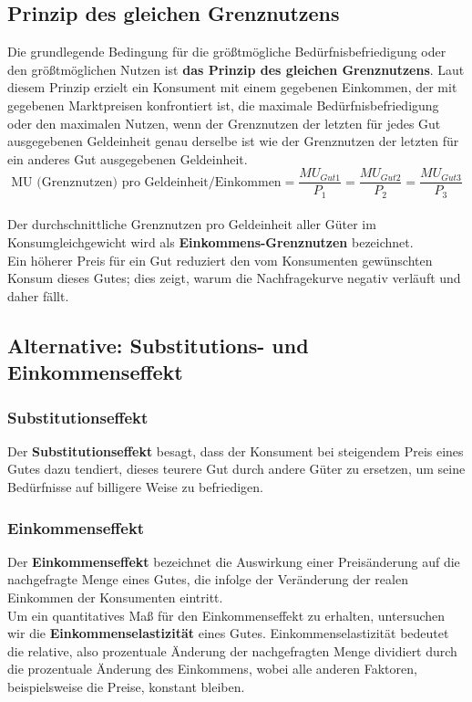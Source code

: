 \documentclass[10pt]{scrartcl}
\begin{document}
\subsection{Prinzip des gleichen Grenznutzens}
Die grundlegende Bedingung für die größtmögliche Bedürfnisbefriedigung oder den größtmöglichen Nutzen ist {\bf das Prinzip des gleichen Grenznutzens}. Laut diesem Prinzip erzielt ein Konsument mit einem gegebenen Einkommen, der mit gegebenen Marktpreisen konfrontiert ist, die maximale Bedürfnisbefriedigung oder den maximalen Nutzen, wenn der Grenznutzen der letzten für jedes Gut ausgegebenen Geldeinheit genau derselbe ist wie der Grenznutzen der letzten für ein anderes Gut ausgegebenen Geldeinheit.\\
\begin{equation}
\text{MU (Grenznutzen) pro Geldeinheit/Einkommen} = \frac{MU_{Gut1}}{P_{1}} = \frac{MU_{Gut2}}{P_{2}} = \frac{MU_{Gut3}}{P_{3}} \nonumber
\end{equation}\\
Der durchschnittliche Grenznutzen pro Geldeinheit aller Güter im Konsumgleichgewicht wird als {\bf Einkommens-Grenznutzen} bezeichnet.\\
Ein höherer Preis für ein Gut reduziert den vom Konsumenten gewünschten Konsum dieses Gutes; dies zeigt, warum die Nachfragekurve negativ verläuft und daher fällt.

\subsection{Alternative: Substitutions- und Einkommenseffekt}
\subsubsection{Substitutionseffekt}
Der {\bf Substitutionseffekt} besagt, dass der Konsument bei steigendem Preis eines Gutes
dazu tendiert, dieses teurere Gut durch andere Güter zu ersetzen, um seine Bedürfnisse auf billigere Weise zu befriedigen.
\subsubsection{Einkommenseffekt}
Der {\bf Einkommenseffekt} bezeichnet die Auswirkung einer Preisänderung auf die nachgefragte Menge eines Gutes, die infolge der Veränderung der realen Einkommen der Konsumenten eintritt. \\
Um ein quantitatives Maß für den Einkommenseffekt zu erhalten, untersuchen wir die
{\bf Einkommenselastizität } eines Gutes. Einkommenselastizität bedeutet die relative, also prozentuale Änderung der nachgefragten Menge dividiert durch die prozentuale Änderung des Einkommens, wobei alle anderen Faktoren, beispielsweise die Preise, konstant bleiben.\\
\end{document}
